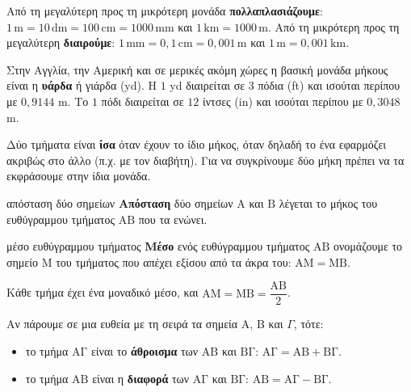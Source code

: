 Από τη μεγαλύτερη προς τη μικρότερη μονάδα \textbf{πολλαπλασιάζουμε}: $1\,\text{m}=10\,\text{dm}=100\,\text{cm}=1000\,\text{mm}$ και $1\,\text{km}=1000\,\text{m}$. Από τη μικρότερη προς τη μεγαλύτερη \textbf{διαιρούμε}: $1\,\text{mm}=0{,}1\,\text{cm}=0{,}001\,\text{m}$ και $1\,\text{m}=0{,}001\,\text{km}$.

Στην Αγγλία, την Αμερική και σε μερικές ακόμη χώρες η βασική μονάδα μήκους είναι η \textbf{υάρδα} ή γιάρδα (yd). Η $1$ yd διαιρείται σε $3$ πόδια (ft) και ισούται περίπου με $0{,}9144$ m. Το $1$ πόδι διαιρείται σε $12$ ίντσες (in) και ισούται περίπου με $0{,}3048$ m.


Δύο τμήματα είναι \textbf{ίσα} όταν έχουν το ίδιο μήκος, όταν δηλαδή το ένα εφαρμόζει ακριβώς στο άλλο (π.χ. με τον διαβήτη). Για να συγκρίνουμε δύο μήκη πρέπει να τα εκφράσουμε στην ίδια μονάδα.

\begin{orismos}{απόσταση δύο σημείων}
\textbf{Απόσταση} δύο σημείων $\mathrm{Α}$ και $\mathrm{Β}$ λέγεται το μήκος του ευθύγραμμου τμήματος $\mathrm{ΑΒ}$ που τα ενώνει.
\end{orismos}

\begin{orismos}{μέσο ευθύγραμμου τμήματος}
\textbf{Μέσο} ενός ευθύγραμμου τμήματος $\mathrm{ΑΒ}$ ονομάζουμε το σημείο $\mathrm{Μ}$ του τμήματος που απέχει εξίσου από τα άκρα του: $\mathrm{ΑΜ}=\mathrm{ΜΒ}$.
\end{orismos}

\begin{center}
\end{center}

Κάθε τμήμα έχει ένα μοναδικό μέσο, και $\mathrm{ΑΜ}=\mathrm{ΜΒ}=\dfrac{\mathrm{ΑΒ}}{2}$.


Αν πάρουμε σε μια ευθεία με τη σειρά τα σημεία $\mathrm{Α}$, $\mathrm{Β}$ και $\Gamma$, τότε:
\begin{itemize}[leftmargin=1.2em,itemsep=0.3ex,topsep=2pt]
\item το τμήμα $\mathrm{ΑΓ}$ είναι το \textbf{άθροισμα} των $\mathrm{ΑΒ}$ και $\mathrm{ΒΓ}$: $\mathrm{ΑΓ}=\mathrm{ΑΒ}+\mathrm{ΒΓ}$.
\item το τμήμα $\mathrm{ΑΒ}$ είναι η \textbf{διαφορά} των $\mathrm{ΑΓ}$ και $\mathrm{ΒΓ}$: $\mathrm{ΑΒ}=\mathrm{ΑΓ}-\mathrm{ΒΓ}$.
\end{itemize}

